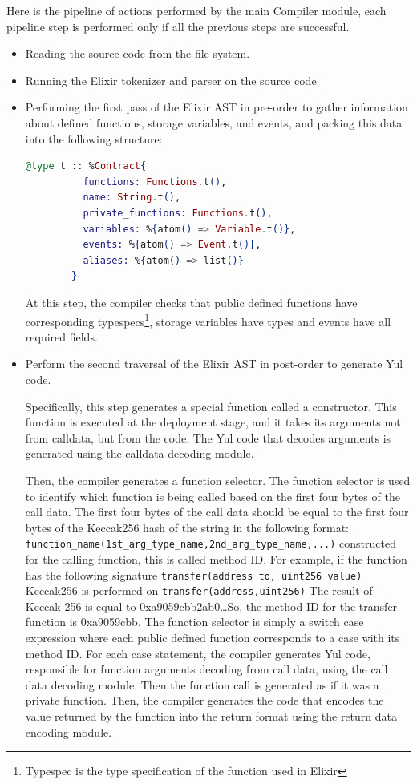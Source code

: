 Here is the pipeline of actions performed by the main Compiler module, each pipeline step is performed only if all the previous steps are successful.

\begin{itemize}
    \item Reading the source code from the file system.
    \item Running the Elixir tokenizer and parser on the source code.
    \item Performing the first pass of the Elixir AST in pre-order to gather information about defined functions, storage variables, and events, and packing this data into the following structure:
    
    \begin{lstlisting}[caption={Contract structure}, language=elixir, label={lst:contract_structure}]
      @type t :: %Contract{
          functions: Functions.t(),
          name: String.t(),
          private_functions: Functions.t(),
          variables: %{atom() => Variable.t()},
          events: %{atom() => Event.t()},
          aliases: %{atom() => list()}
        }
    \end{lstlisting}
    
    At this step, the compiler checks that public defined functions have corresponding typespecs\footnote{Typespec is the type specification of the function used in Elixir}, storage variables have types and events have all required fields.

    \item Perform the second traversal of the Elixir AST in post-order to generate Yul code.
    
    Specifically, this step generates a special function called a constructor. This function is executed at the deployment stage, and it takes its arguments not from calldata, but from the code. The Yul code that decodes arguments is generated using the calldata decoding module.

    Then, the compiler generates a function selector. The function selector is used to identify which function is being called based on the first four bytes of the call data. The first four bytes of the call data should be equal to the first four bytes of the Keccak256 hash of the string in the following format:
    \lstinline|function_name(1st_arg_type_name,2nd_arg_type_name,...)|
    constructed for the calling function, this is called method ID. For example, if the function has the following signature 
    \lstinline|transfer(address to, uint256 value)|
    Keccak256 is performed on 
    \lstinline|transfer(address,uint256)| The result of Keccak 256 is equal to 0xa9059cbb2ab0\dots So, the method ID for the transfer function is 0xa9059cbb. The function selector is simply a switch case expression where each public defined function corresponds to a case with its method ID. For each case statement, the compiler generates Yul code, responsible for function arguments decoding from call data, using the call data decoding module. Then the function call is generated as if it was a private function. Then, the compiler generates the code that encodes the value returned by the function into the return format using the return data encoding module.


\end{itemize}
